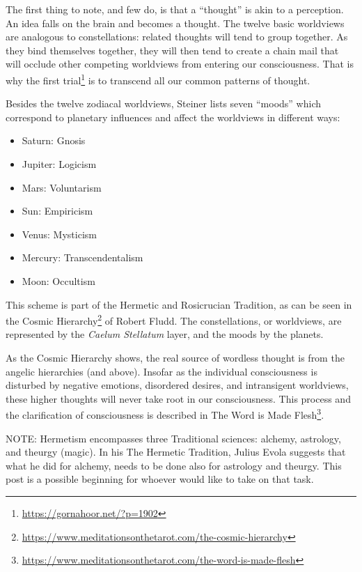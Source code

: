 The first thing to note, and few do, is that a ``thought'' is akin to a perception. An idea falls on the brain and becomes a thought. The twelve basic worldviews are analogous to constellations: related thoughts will tend to group together. As they bind themselves together, they will then tend to create a chain mail that will occlude other competing worldviews from entering our consciousness. That is why the first trial\footnote{\url{https://gornahoor.net/?p=1902}} is to transcend all our common patterns of thought.

Besides the twelve zodiacal worldviews, Steiner lists seven ``moods'' which correspond to planetary influences and affect the worldviews in different ways:

\begin{itemize}


\item Saturn: Gnosis

\item Jupiter: Logicism

\item Mars: Voluntarism

\item Sun: Empiricism

\item Venus: Mysticism

\item Mercury: Transcendentalism

\item Moon: Occultism
\end{itemize}


This scheme is part of the Hermetic and Rosicrucian Tradition, as can be seen in the Cosmic Hierarchy\footnote{\url{https://www.meditationsonthetarot.com/the-cosmic-hierarchy}} of Robert Fludd. The constellations, or worldviews, are represented by the \emph{Caelum Stellatum} layer, and the moods by the planets.

As the Cosmic Hierarchy shows, the real source of wordless thought is from the angelic hierarchies (and above). Insofar as the individual consciousness is disturbed by negative emotions, disordered desires, and intransigent worldviews, these higher thoughts will never take root in our consciousness. This process and the clarification of consciousness is described in The Word is Made Flesh\footnote{\url{https://www.meditationsonthetarot.com/the-word-is-made-flesh}}.

NOTE: Hermetism encompasses three Traditional sciences: alchemy, astrology, and theurgy (magic). In his The Hermetic Tradition, Julius Evola suggests that what he did for alchemy, needs to be done also for astrology and theurgy. This post is a possible beginning for whoever would like to take on that task.


